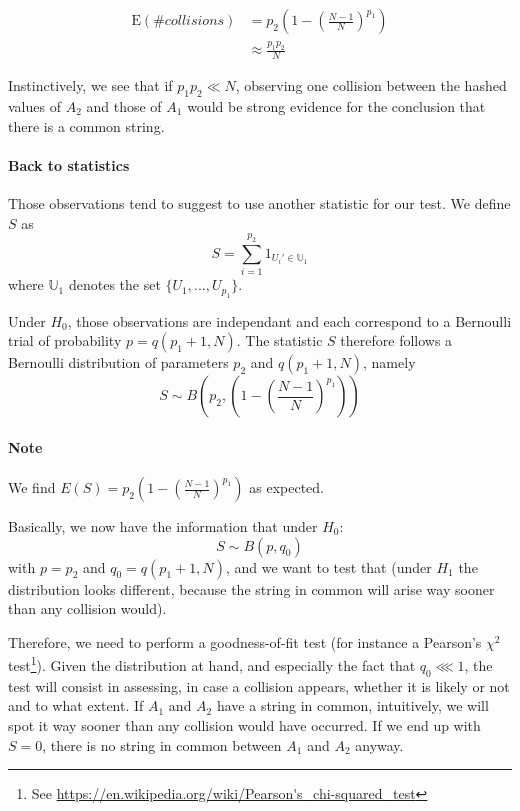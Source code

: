 \documentclass[usletter,11pt,final]{article}
\begin{document}
\begin{equation}
\begin{aligned}
\textrm{E}(\#collisions)  & = p_2 \left(1 - \left(\frac{N-1}{N}\right)^{p_1}\right)\\
					   & \approx \frac{p_1 p_2}{N}
\end{aligned}
\end{equation}

Instinctively, we see that if $p_1 p_2 \ll N$, observing one collision between the hashed values of $A_2$ and those of $A_1$ would be strong evidence for the conclusion that there is a common string.

\paragraph{Back to statistics}
Those observations tend to suggest to use another statistic for our test. We define $S$ as $$S = \sum_{i=1}^{p_2} 1_{U_i' \in \mathbb{U}_1}$$ where $\mathbb{U}_1$ denotes the set $\{U_1, ..., U_{p_1}\}$.

Under $H_0$, those observations are independant and each correspond to a Bernoulli trial of probability $p = q(p_1+1,N)$.
The statistic $S$ therefore follows a Bernoulli distribution of parameters $p_2$ and $q(p_1+1,N)$, namely $$ S \sim B(p_2, \left(1 - \left(\frac{N-1}{N}\right)^{p_1}\right))$$

\paragraph{Note} We find $E(S) = p_2 \left(1 - \left(\frac{N-1}{N}\right)^{p_1}\right)$ as expected.

\vspace{5mm}
Basically, we now have the information that under $H_0$: $$S \sim B(p, q_0)$$ with $p = p_2$ and $q_0=q(p_1+1,N)$, and we want to test that (under $H_1$ the distribution looks different, because the string in common will arise way sooner than any collision would).

Therefore, we need to perform a goodness-of-fit test (for instance a Pearson's $\chi^2$ test\footnote{See \url{https://en.wikipedia.org/wiki/Pearson's_chi-squared_test}}). Given the distribution at hand, and especially the fact that $q_0 \lll 1$, the test will consist in assessing, in case a collision appears, whether it is likely or not and to what extent. If $A_1$ and $A_2$ have a string in common, intuitively, we will spot it way sooner than any collision would have occurred.
If we end up with $S=0$, there is no string in common between $A_1$ and $A_2$ anyway.
\end{document}
